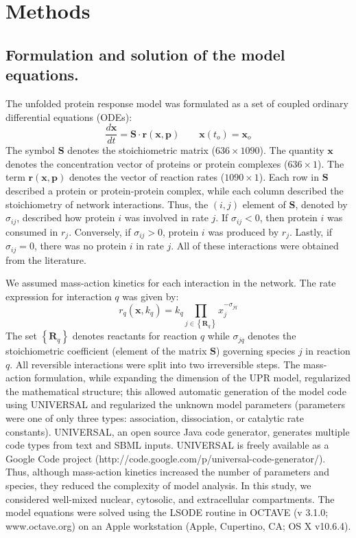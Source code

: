 \documentclass[fleqn,10pt]{wlscirep}
\begin{document}
\section*{Methods}

\subsection*{Formulation and solution of the model equations.}
The unfolded protein response model was formulated as a set of coupled ordinary differential equations (ODEs):
\begin{equation}\label{asseassertain_massbalance}
\frac{d\mathbf{x}}{dt}=\mathbf{S}\cdot\mathbf{r}\left(\mathbf{x},\mathbf{p}\right)\qquad\mathbf{x}\left(t_{o}\right)=\mathbf{x}_{o}
\end{equation}
The symbol $\mathbf{S}$ denotes the stoichiometric matrix ($636\times 1090$). The quantity $\mathbf{x}$ denotes the concentration vector of proteins or protein complexes ($636\times 1$). 
The term $\mathbf{r}\left(\mathbf{x},\mathbf{p}\right)$ denotes the vector of reaction rates ($1090\times{1}$). 
Each row in $\mathbf{S}$ described a protein or protein-protein complex,
while each column described the stoichiometry of network interactions. 
Thus, the $(i,j)$ element of $\mathbf{S}$, denoted by $\sigma_{ij}$, described how protein $i$ was involved in rate $j$. 
If $\sigma_{ij}<0$, then protein $i$ was consumed in $r_j$. Conversely, if $\sigma_{ij}>0$, protein $i$ was
produced by $r_j$. Lastly, if $\sigma_{ij}=0$, there was no protein $i$ in rate $j$. All of these interactions were obtained from the literature. 

We assumed mass-action kinetics for each interaction in the network. 
The rate expression for interaction $q$ was given by:
\begin{equation}\label{eq-mass-action}
r_{q}\left(\mathbf{x},k_{q}\right)=k_{q}\prod_{j\in\left\{\mathbf{R}_{q}\right\}}x_{j}^{-\sigma_{jq}}
\end{equation}
The set $\left\{\mathbf{R}_{q}\right\}$ denotes reactants for reaction $q$ while $\sigma_{jq}$ denotes the stoichiometric coefficient (element of the matrix $\mathbf{S}$) governing species $j$ in reaction $q$. 
All reversible interactions were split into two irreversible steps. The mass-action formulation, while expanding the dimension of the UPR model, 
regularized the mathematical structure; this allowed automatic generation of the model code using UNIVERSAL and regularized the unknown model parameters (parameters were one of only three types: association, dissociation, or catalytic rate constants).
UNIVERSAL, an open source Java code generator, generates multiple code types from text and SBML inputs.
UNIVERSAL is freely available as a Google Code project (http://code.google.com/p/universal-code-generator/). 
Thus, although mass-action kinetics increased the number of parameters and species, they reduced the complexity of model analysis. 
In this study, we considered well-mixed nuclear, cytosolic, and extracellular compartments. 
The model equations were solved using the LSODE routine in OCTAVE (v 3.1.0; www.octave.org) on an Apple workstation (Apple, Cupertino, CA; OS X v10.6.4). 
\end{document}
